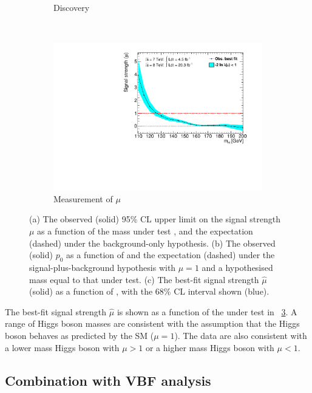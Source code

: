 \begin{figure}[t]
\begin{subfigure}[b]{0.495\textwidth}
		\caption{Discovery}
		\label{fig:ggf_results:p0}
	\end{subfigure}
	\\[12pt]
	\begin{subfigure}[b]{0.495\textwidth}
		\centering
		\includegraphics[width=\textwidth,clip=true,trim=0.6cm 0.8cm 1.0cm 0.4cm]{custom_images/limits/mu_ggf_only}
		\caption{Measurement of $\mu$}
		\label{fig:ggf_results:mu}
	\end{subfigure}
	\caption{(a) The observed (solid) 95\% CL upper limit on the signal strength $\mu$ as a 
	function of the mass under test \mH, and the expectation (dashed) under the 
	background-only hypothesis. (b) The observed (solid) $p_0$ as a function of \mH and the 
	expectation (dashed) under the signal-plus-background hypothesis with $\mu = 1$ and a 
	hypothesised mass equal to that under test.	(c) The best-fit signal strength $\hat{\mu}$ 
	(solid) as a function of \mH, with the 68\% CL interval shown (blue).}
\end{figure}

The best-fit signal strength $\hat{\mu}$ is shown as a function of the \mH under test in 
\Figure~\ref{fig:ggf_results:mu}. A range of Higgs boson masses are consistent with the 
assumption that the Higgs boson behaves as predicted by the SM (\ie $\mu = 1$). The data 
are also consistent with a lower mass Higgs boson with $\mu > 1$ or a higher mass Higgs 
boson with $\mu < 1$. 



\subsection{Combination with VBF analysis}
\label{sec:results:combined_limits}


